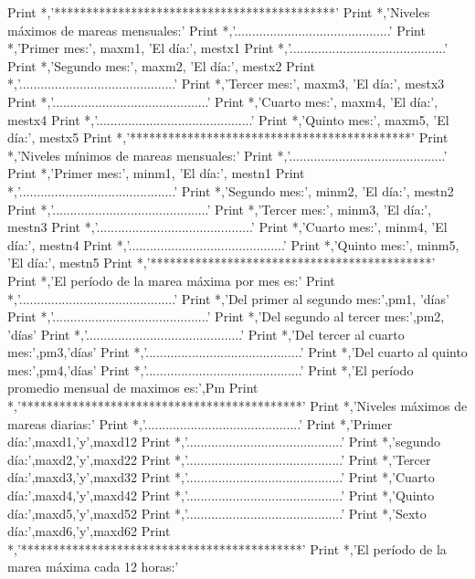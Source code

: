 Print *,'********************************************'
Print *,'Niveles máximos de mareas mensuales:'
Print *,'............................................'
Print *,'Primer mes:', maxm1, 'El día:', mestx1
Print *,'............................................'
Print *,'Segundo mes:', maxm2, 'El día:', mestx2
Print *,'............................................'
Print *,'Tercer mes:', maxm3, 'El día:', mestx3
Print *,'............................................'
Print *,'Cuarto mes:', maxm4, 'El día:', mestx4
Print *,'............................................'
Print *,'Quinto mes:', maxm5, 'El día:', mestx5
Print *,'********************************************'
Print *,'Niveles mínimos de mareas mensuales:'
Print *,'............................................'
Print *,'Primer mes:', minm1, 'El día:', mestn1
Print *,'............................................'
Print *,'Segundo mes:', minm2, 'El día:', mestn2
Print *,'............................................'
Print *,'Tercer mes:', minm3, 'El día:', mestn3
Print *,'............................................'
Print *,'Cuarto mes:', minm4, 'El día:', mestn4
Print *,'............................................'
Print *,'Quinto mes:', minm5, 'El día:', mestn5
Print *,'********************************************'
Print *,'El período de la marea máxima por mes es:'
Print *,'............................................'
Print *,'Del primer al segundo mes:',pm1, 'días'
Print *,'............................................'
Print *,'Del segundo al tercer mes:',pm2, 'días'
Print *,'............................................'
Print *,'Del tercer al cuarto mes:',pm3,'días'
Print *,'............................................'
Print *,'Del cuarto al quinto mes:',pm4,'días'
Print *,'............................................'
Print *,'El período promedio mensual de maximos es:',Pm
Print *,'********************************************'
Print *,'Niveles máximos de mareas diarias:'
Print *,'............................................'
Print *,'Primer día:',maxd1,'y',maxd12  
Print *,'............................................'
Print *,'segundo día:',maxd2,'y',maxd22  
Print *,'............................................'
Print *,'Tercer día:',maxd3,'y',maxd32  
Print *,'............................................'
Print *,'Cuarto día:',maxd4,'y',maxd42  
Print *,'............................................'
Print *,'Quinto día:',maxd5,'y',maxd52  
Print *,'............................................'
Print *,'Sexto día:',maxd6,'y',maxd62  
Print *,'********************************************'
Print *,'El período de la marea máxima cada 12 horas:'
